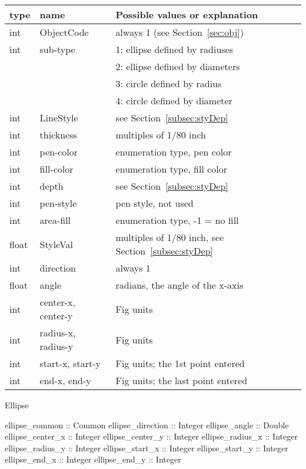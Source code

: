 \documentclass[10pt, a4paper]{article}
\begin{document}
\begin{tabular}{|lll|}
\hline
type & name & Possible values or explanation \\
\hline
\hline
int   &  ObjectCode             & always 1 (see Section~\ref{sec:obj}) \\
int   &  sub-type                & 1: ellipse defined by radiuses \\
&&                                 2: ellipse defined by diameters \\
&&                                 3: circle defined by radius \\
&&                                 4: circle defined by diameter \\
int   &  LineStyle              & see Section~\ref{subsec:styDep} \\
int   &  thickness               & multiples of 1/80 inch \\
int   &  pen-color               & enumeration type, pen color \\
int   &  fill-color              & enumeration type, fill color \\
int   &  depth                   & see Section~\ref{subsec:styDep} \\
int   &  pen-style               & pen style, not used \\
int   &  area-fill               & enumeration type, -1 = no fill \\%
float &  StyleVal               & multiples of 1/80 inch, see Section~\ref{subsec:styDep}  \\
int   &  direction               & always 1 \\
float &  angle                   & radians, the angle of the x-axis \\
int   &  center-x, center-y      & Fig units \\
int   &  radius-x, radius-y      & Fig units \\
int   &  start-x, start-y        & Fig units; the 1st point entered \\
int   &  end-x, end-y            & Fig units; the last point entered \\
\hline
\end{tabular}


Ellipse	 

ellipse\_common :: Common
ellipse\_direction :: Integer
ellipse\_angle :: Double
ellipse\_center\_x :: Integer
ellipse\_center\_y :: Integer
ellipse\_radius\_x :: Integer
ellipse\_radius\_y :: Integer
ellipse\_start\_x :: Integer
ellipse\_start\_y :: Integer
ellipse\_end\_x :: Integer
ellipse\_end\_y :: Integer
\end{document}
